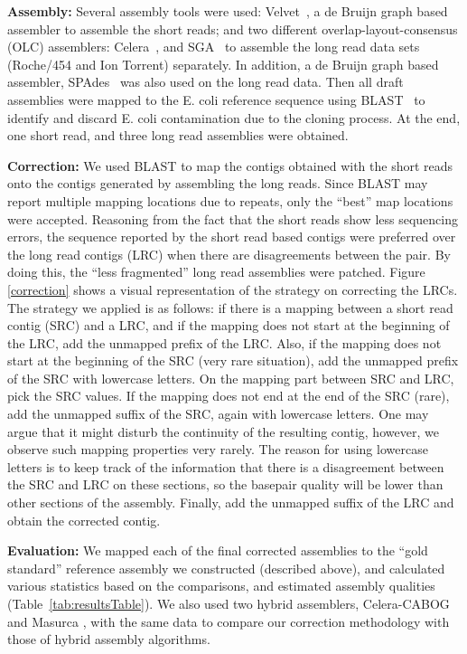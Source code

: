 \documentclass[12pt,a4paper]{cibb}
\begin{document}
\textbf{Assembly:} Several assembly tools were used: Velvet~\cite{velvetZerbino:2008}, a de Bruijn graph based assembler to assemble the short reads; and two different overlap-layout-consensus (OLC) assemblers: Celera~\cite{celera:2000}, and SGA~\cite{sga:2012} to assemble the long read data sets (Roche/454 and Ion Torrent) separately. In addition, a de Bruijn graph based assembler, SPAdes~\cite{spadesBankevich:2012} was also used on the long read data. 
Then all draft assemblies were mapped to the E. coli reference sequence using BLAST~\cite{blast} to identify and discard E. coli contamination due to the cloning process. At the end, one short read, and three long read assemblies were obtained.

\textbf{Correction:} We used BLAST \cite{blast} to map the contigs obtained with the short reads onto the contigs generated by assembling the long reads. Since BLAST may report multiple mapping locations due to repeats, only the ``best'' map locations were accepted. Reasoning from the fact that the short reads show less sequencing errors, the sequence reported by the short read based contigs were preferred over the long read contigs (LRC) when there are disagreements between the pair. By doing this, the ``less fragmented'' long read assemblies were patched. Figure \ref{correction} shows a visual representation of the strategy on correcting the LRCs. The strategy we applied is as follows: if there is a mapping between a short read contig (SRC) and a LRC, and if the mapping does not start at the beginning of the LRC, add the unmapped prefix of the LRC. Also, if the mapping does not start at the beginning of the SRC (very rare situation), add the unmapped prefix of the SRC with lowercase letters. On the mapping part between SRC and LRC, pick the SRC values. If the mapping does not end at the end of the SRC (rare), add the unmapped suffix of the SRC, again with lowercase letters. One may argue that it might disturb the continuity of the resulting contig, however, we observe such mapping properties very rarely. The reason for using lowercase letters is to keep track of the information that there is a disagreement between the SRC and LRC on these sections, so the basepair quality will be lower than other sections of the assembly.  Finally, add the unmapped suffix of the LRC and obtain the corrected contig.

\textbf{Evaluation:} We mapped each of the final corrected assemblies to the ``gold standard'' reference assembly we constructed (described above), and calculated various statistics based on the comparisons, and estimated assembly qualities (Table~\ref{tab:resultsTable}). We also used two hybrid assemblers, Celera-CABOG~\cite{cabogMiller:2008} and Masurca \cite{masurcaZimin:2013}, with the same data to compare our correction methodology with those of hybrid assembly algorithms.
\end{document}
